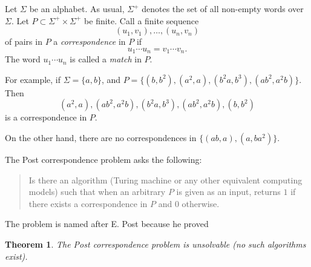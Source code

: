 \documentclass[12pt]{article}
\newtheorem{thm}{Theorem}
\begin{document}
Let $\Sigma$ be an alphabet.  As usual, $\Sigma^+$ denotes the set of all non-empty words over $\Sigma$.  Let $P\subset \Sigma^+ \times \Sigma^+$ be finite.  Call a finite sequence 
$$(u_1,v_1),\ldots, (u_n,v_n)$$
of pairs in $P$ a \emph{correspondence} in $P$ if $$u_1\cdots u_n = v_1\cdots v_n.$$
The word $u_1\cdots u_n$ is called a \emph{match} in $P$.

For example, if $\Sigma=\lbrace a,b\rbrace$, and $P=\lbrace (b,b^2), (a^2,a), (b^2a,b^3), (ab^2,a^2b) \rbrace$.  Then $$(a^2,a), (ab^2,a^2b), (b^2a,b^3), (ab^2,a^2b), (b,b^2)$$ is a correspondence in $P$.

On the other hand, there are no correspondences in $\lbrace (ab, a), (a, ba^2)\rbrace$.

The Post correspondence problem asks the following:
\begin{quote}
Is there an algorithm (Turing machine or any other equivalent computing models) such that when an arbitrary $P$ is given as an input, returns $1$ if there exists a correspondence in $P$ and $0$ otherwise.
\end{quote}

The problem is named after E. Post because he proved
\begin{thm} The Post correspondence problem is unsolvable (no such algorithms exist). \end{thm}
\end{document}
